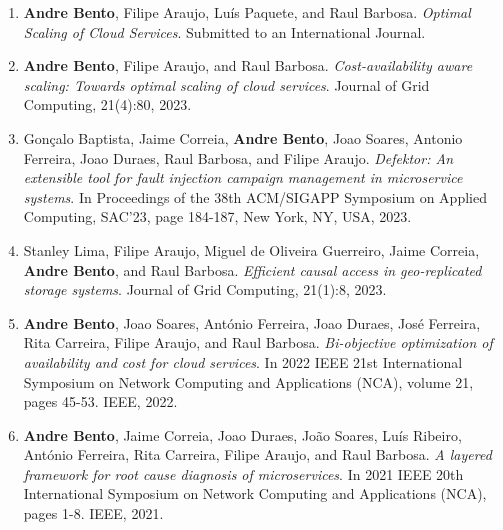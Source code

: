 \documentclass[a4paper,12pt]{memoir}
\begin{document}
\begin{enumerate}[leftmargin=*]
	\item \textbf{Andre Bento}, Filipe Araujo, Luís Paquete, and Raul Barbosa. 
	\emph{Optimal Scaling of Cloud Services}. Submitted to an International Journal.
	\item \textbf{Andre Bento}, Filipe Araujo, and Raul Barbosa. \emph{Cost-availability aware scaling: Towards optimal scaling of cloud services}. Journal of Grid Computing, 21(4):80, 2023.%
	\item Gonçalo Baptista, Jaime Correia, \textbf{Andre Bento}, Joao Soares, Antonio Ferreira, Joao Duraes, Raul Barbosa, and Filipe Araujo. \emph{Defektor: An extensible tool for fault injection campaign management in microservice systems}. In Proceedings of the 38th ACM/SIGAPP Symposium on Applied Computing, SAC'23, page 184-187, New York, NY, USA, 2023.%
	\item Stanley Lima, Filipe Araujo, Miguel de Oliveira Guerreiro, Jaime Correia, \textbf{Andre Bento}, and Raul Barbosa. \emph{Efficient causal access in geo-replicated storage systems}. Journal of Grid Computing, 21(1):8, 2023.%
	\item \textbf{Andre Bento}, Joao Soares, António Ferreira, Joao Duraes, José Ferreira, Rita Carreira, Filipe Araujo, and Raul Barbosa. \emph{Bi-objective optimization of availability and cost for cloud services}. In 2022 IEEE 21st International Symposium on Network Computing and Applications (NCA), volume 21, pages 45-53. IEEE, 2022.%
	\item \textbf{Andre Bento}, Jaime Correia, Joao Duraes, João Soares, Luís Ribeiro, António Ferreira, Rita Carreira, Filipe Araujo, and Raul Barbosa. \emph{A layered framework for root cause diagnosis of microservices}. In 2021 IEEE 20th International Symposium on Network Computing and Applications (NCA), pages 1-8. IEEE, 2021.%

\end{enumerate}
\end{document}
